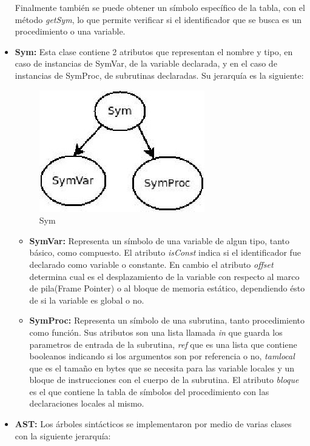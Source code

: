 \documentclass[11pt, spanish]{report}
\begin{document}
\begin{itemize}
  Finalmente tambi\'en se puede obtener un s\'imbolo espec\'ifico de la tabla, con el m\'etodo \emph{getSym}, lo que permite verificar si el identificador que se busca es un 
  procedimiento o una variable.\\
\item \textbf{Sym:}    
  Esta clase contiene 2 atributos que representan el nombre y tipo, en caso de instancias de SymVar, de la variable declarada, y en el caso de instancias de SymProc, de subrutinas 
  declaradas. Su jerarqu\'ia es la siguiente:\\
  
  \begin{figure}[htp]
    \centering
    \mbox{\includegraphics[scale=0.5]{sym.jpg}}
    \caption{Sym}
    \label{fig sym}
  \end{figure}
  
  \begin{itemize}
  \item \textbf{SymVar:}      
    Representa un s\'imbolo de una variable de algun tipo, tanto b\'asico, como compuesto. El atributo \emph{isConst} indica si el identificador fue declarado como variable o 
    constante. En cambio el atributo \emph{offset} determina cual es el desplazamiento de la variable con respecto al marco de pila(Frame Pointer) o al bloque de memoria est\'atico, dependiendo \'esto de si la variable es global o no.
    
  \item \textbf{SymProc:}      
    Representa un s\'imbolo de una subrutina, tanto procedimiento como funci\'on. Sus atributos son una lista llamada \emph{in} que guarda los parametros de entrada de la subrutina, \emph{ref} que es una lista que contiene booleanos indicando si los argumentos son por referencia o no,
    \emph{tamlocal} que es el tamaño en bytes que se necesita para las variable locales y un bloque de instrucciones con el cuerpo de la subrutina. El atributo \emph{bloque} es el que contiene la tabla de s\'imbolos del procedimiento con las declaraciones locales al mismo.
  \end{itemize}
\item \textbf{AST:}
  Los \'arboles sint\'acticos se implementaron por medio de varias clases con la siguiente jerarqu\'ia:\\
  

\end{itemize}
\end{document}
